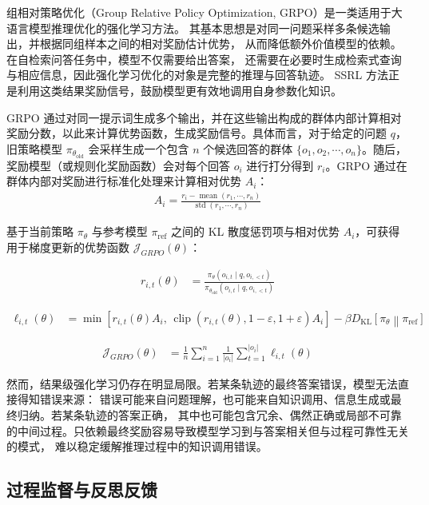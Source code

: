 组相对策略优化（Group Relative Policy Optimization, GRPO）是一类适用于大语言模型推理优化的强化学习方法。
其基本思想是对同一问题采样多条候选输出，并根据同组样本之间的相对奖励估计优势，
从而降低额外价值模型的依赖。在自检索问答任务中，模型不仅需要给出答案，
还需要在必要时生成检索式查询与相应信息，因此强化学习优化的对象是完整的推理与回答轨迹。
SSRL 方法正是利用这类结果奖励信号，鼓励模型更有效地调用自身参数化知识。

GRPO 通过对同一提示词生成多个输出，并在这些输出构成的群体内部计算相对奖励分数，以此来计算优势函数，生成奖励信号。具体而言，对于给定的问题 $q$，旧策略模型 $\pi_{\theta_{\mathrm{old}}}$ 会采样生成一个包含 $n$ 个候选回答的群体 $\{o_1,o_2,\cdots,o_n\}$。随后，奖励模型（或规则化奖励函数）会对每个回答 $o_i$ 进行打分得到 $r_i$。GRPO 通过在群体内部对奖励进行标准化处理来计算相对优势 $A_i$：
\begin{align}
A_i=\frac{r_i-\operatorname{mean}(r_1,\cdots,r_n)}
{\operatorname{std}(r_1,\cdots,r_n)}
\end{align}

基于当前策略 $\pi_\theta$ 与参考模型 $\pi_{\mathrm{ref}}$ 之间的 KL 散度惩罚项与相对优势 $A_i$，可获得用于梯度更新的优势函数 $\mathcal{J}_{GRPO}(\theta)$：

\begin{align}
r_{i,t}(\theta)
&=
\frac{\pi_\theta(o_{i,t}\mid q,o_{i,<t})}
{\pi_{\theta_{\mathrm{old}}}(o_{i,t}\mid q,o_{i,<t})}
\end{align}

\begin{align}
\ell_{i,t}(\theta)
&=
\min\left[
r_{i,t}(\theta)A_i,\,
\operatorname{clip}\!\left(
r_{i,t}(\theta),
1-\varepsilon,
1+\varepsilon
\right)A_i
\right]
-\beta D_{\mathrm{KL}}\!\left[
\pi_\theta \middle\| \pi_{\mathrm{ref}}
\right]
\end{align}

\begin{align}
\mathcal{J}_{GRPO}(\theta)
&=
\frac{1}{n}\sum_{i=1}^{n}
\frac{1}{|o_i|}\sum_{t=1}^{|o_i|}
\ell_{i,t}(\theta)
\end{align}

然而，结果级强化学习仍存在明显局限。若某条轨迹的最终答案错误，模型无法直接得知错误来源：
错误可能来自问题理解，也可能来自知识调用、信息生成或最终归纳。若某条轨迹的答案正确，
其中也可能包含冗余、偶然正确或局部不可靠的中间过程。只依赖最终奖励容易导致模型学习到与答案相关但与过程可靠性无关的模式，
难以稳定缓解推理过程中的知识调用错误。

\subsection{过程监督与反思反馈}

